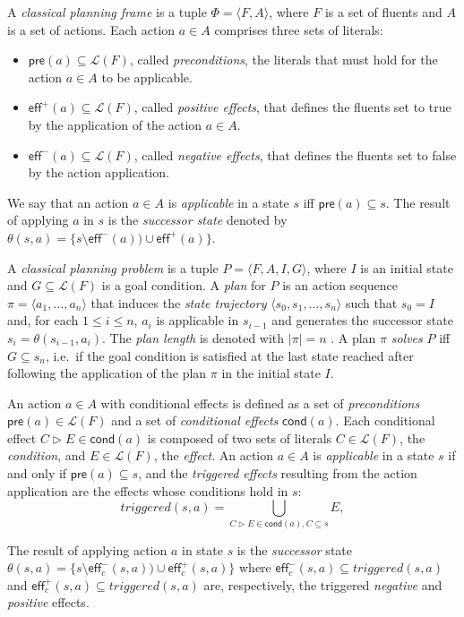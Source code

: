 \documentclass{article}
\newcommand{\tup}[1]{{\langle #1 \rangle}}
\newcommand{\pre}{\mathsf{pre}}     %
\newcommand{\eff}{\mathsf{eff}}     %
\newcommand{\cond}{\mathsf{cond}}   %
\begin{document}
A {\em classical planning frame} is a tuple $\Phi=\tup{F,A}$, where $F$ is a set of fluents and $A$ is a set of actions. Each action $a\in A$ comprises three sets of literals:
\begin{itemize}
\item $\pre(a)\subseteq\mathcal{L}(F)$, called {\em preconditions}, the literals that must hold for the action $a\in A$ to be applicable.
\item $\eff^+(a)\subseteq\mathcal{L}(F)$, called {\em positive effects}, that defines the fluents set to true by the application of the action $a\in A$.
\item $\eff^-(a)\subseteq\mathcal{L}(F)$, called {\em negative effects}, that defines the fluents set to false by the action application.
\end{itemize}
We say that an action $a\in A$ is {\em applicable} in a state $s$ iff $\pre(a)\subseteq s$. The result of applying $a$ in $s$ is the {\em successor state} denoted by $\theta(s,a)=\{s\setminus\eff^-(a))\cup\eff^+(a)\}$.

A {\em classical planning problem} is a tuple $P=\tup{F,A,I,G}$, where $I$ is an initial state and $G\subseteq\mathcal{L}(F)$ is a goal condition. A {\em plan} for $P$ is an action sequence $\pi=\tup{a_1, \ldots, a_n}$ that induces the {\em state trajectory} $\tup{s_0, s_1, \ldots, s_n}$ such that $s_0=I$ and, for each {\small $1\leq i\leq n$}, $a_i$ is applicable in $s_{i-1}$ and generates the successor state $s_i=\theta(s_{i-1},a_i)$. The {\em plan length} is denoted with $|\pi|=n$ . A plan $\pi$ {\em solves} $P$ iff $G\subseteq s_n$, i.e.~if the goal condition is satisfied at the last state reached after following the application of the plan $\pi$ in the initial state $I$.

An action $a\in A$ with conditional effects is defined as a set of {\em preconditions} $\pre(a)\in\mathcal{L}(F)$ and a set of {\em conditional effects} $\cond(a)$. Each conditional effect $C\rhd E\in\cond(a)$ is composed of two sets of literals $C\in\mathcal{L}(F)$, the {\em condition}, and $E\in\mathcal{L}(F)$, the {\em effect}. An action $a\in A$ is {\em applicable} in a state $s$ if and only if $\pre(a)\subseteq s$, and the {\em triggered effects} resulting from the action application are the effects whose conditions hold in $s$:
\[
triggered(s,a)=\bigcup_{C\rhd E\in\cond(a),C\subseteq s} E,
\]

The result of applying action $a$ in state $s$ is the {\em successor} state $\theta(s,a)=\{s\setminus\eff_c^-(s,a))\cup\eff_c^+(s,a)\}$ where $\eff_c^-(s,a)\subseteq triggered(s,a)$ and $\eff_c^+(s,a)\subseteq triggered(s,a)$ are, respectively, the triggered {\em negative} and {\em positive} effects.
\end{document}
